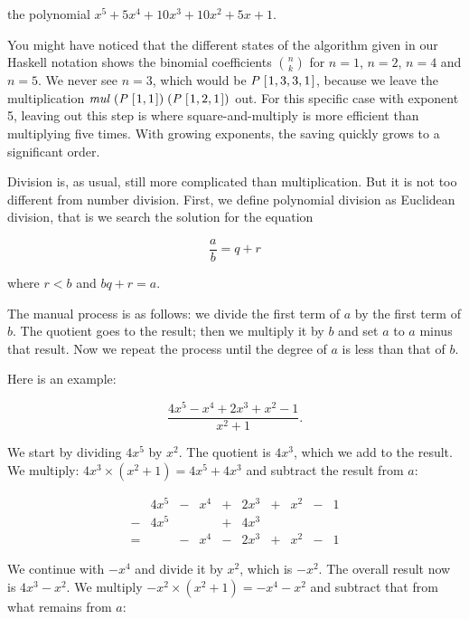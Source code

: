 \documentclass[tikz]{scrreprt}
\newcommand{\Conid}[1]{\mathit{#1}}
\newcommand{\Varid}[1]{\mathit{#1}}
\begin{document}
the polynomial $x^5 + 5x^4 + 10x^3 + 10x^2 + 5x + 1$.

You might have noticed that the different
states of the algorithm given in our Haskell notation
shows the binomial coefficients $\binom{n}{k}$ for
$n=1$, $n=2$, $n=4$ and $n=5$.
We never see $n=3$, which would be 
\ensuremath{\Conid{P}\;[\mskip1.5mu \mathrm{1},\mathrm{3},\mathrm{3},\mathrm{1}\mskip1.5mu]}, because we leave the multiplication
\ensuremath{\Varid{mul}\;(\Conid{P}\;[\mskip1.5mu \mathrm{1},\mathrm{1}\mskip1.5mu])\;(\Conid{P}\;[\mskip1.5mu \mathrm{1},\mathrm{2},\mathrm{1}\mskip1.5mu])} out.
For this specific case with exponent 5,
leaving out this step is where square-and-multiply
is more efficient than multiplying five times.
With growing exponents, the saving quickly grows
to a significant order.

Division is, as usual, still more complicated than multiplication.
But it is not too different from number division. First,
we define polynomial division as Euclidean division, that is
we search the solution for the equation

\begin{equation}
\frac{a}{b} = q + r
\end{equation}

where $r < b$ and $bq+r=a$.

The manual process is as follows:
we divide the first term of $a$ by the first term of $b$.
The quotient goes to the result; then we multiply it by $b$
and set $a$ to $a$ minus that result.
Now we repeat the process
until the degree of $a$
is less than that of $b$.

Here is an example:

\[
\frac{4x^5 - x^4 + 2x^3 + x^2 - 1}{x^2 + 1}.
\]

We start by dividing $4x^5$ by $x^2$.
The quotient is $4x^3$, which we add to the result.
We multiply: $4x^3 \times (x^2 + 1) = 4x^5 + 4x^3$
and subtract the result from $a$:

\begin{equation}
\begin{array}{crcrcrcrcr}
  & 4x^5 & - &  x^4 & + & 2x^3 & + & x^2 & - & 1\\
- & 4x^5 &   &      & + & 4x^3 &   &     &   &  \\
= &      & - &  x^4 & - & 2x^3 & + & x^2 & - & 1
\end{array}
\end{equation}

We continue with
$-x^4$ and divide it by $x^2$, which is
$-x^2$. 
The overall result now is $4x^3 - x^2$.
We multiply $-x^2 \times (x^2 + 1) = -x^4 - x^2$
and subtract that from what remains from $a$:
\end{document}
